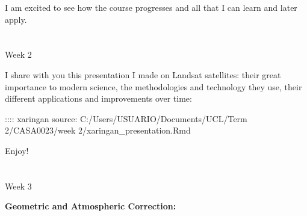 \documentclass[
  letterpaper,
  DIV=11,
  numbers=noendperiod]{scrreprt}
\begin{document}
I am excited to see how the course progresses and all that I can learn
and later apply.


\hypertarget{section-1}{%
\chapter{}\label{section-1}}

Week 2

I share with you this presentation I made on Landsat satellites: their
great importance to modern science, the methodologies and technology
they use, their different applications and improvements over time:

:::: xaringan source: C:/Users/USUARIO/Documents/UCL/Term
2/CASA0023/week 2/xaringan\_presentation.Rmd

Enjoy!


\hypertarget{section-2}{%
\chapter{}\label{section-2}}

Week 3

\textbf{Geometric and Atmospheric Correction:}
\end{document}
